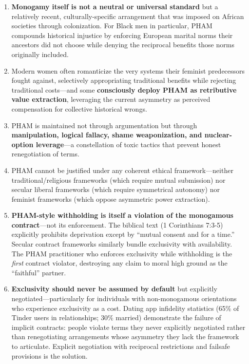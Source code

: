 \documentclass[12pt, letterpaper]{article}
\begin{document}
\begin{enumerate}
    \item \textbf{Monogamy itself is not a neutral or universal standard} but a relatively recent, culturally-specific arrangement that was imposed on African societies through colonization. For Black men in particular, PHAM compounds historical injustice by enforcing European marital norms their ancestors did not choose while denying the reciprocal benefits those norms originally included.
    
    \item Modern women often romanticize the very systems their feminist predecessors fought against, selectively appropriating traditional benefits while rejecting traditional costs---and some \textbf{consciously deploy PHAM as retributive value extraction}, leveraging the current asymmetry as perceived compensation for collective historical wrongs.
    
    \item PHAM is maintained not through argumentation but through \textbf{manipulation, logical fallacy, shame weaponization, and nuclear-option leverage}---a constellation of toxic tactics that prevent honest renegotiation of terms.
    
    \item PHAM cannot be justified under any coherent ethical framework---neither traditional/religious frameworks (which require mutual submission) nor secular liberal frameworks (which require symmetrical autonomy) nor feminist frameworks (which oppose asymmetric power extraction).
    
    \item \textbf{PHAM-style withholding is itself a violation of the monogamous contract}---not its enforcement. The biblical text (1 Corinthians 7:3-5) explicitly prohibits deprivation except by ``mutual consent and for a time.'' Secular contract frameworks similarly bundle exclusivity with availability. The PHAM practitioner who enforces exclusivity while withholding is the \textit{first} contract violator, destroying any claim to moral high ground as the ``faithful'' partner.
    
    \item \textbf{Exclusivity should never be assumed by default} but explicitly negotiated---particularly for individuals with non-monogamous orientations who experience exclusivity as a cost. Dating app infidelity statistics (65\% of Tinder users in relationships; 30\% married) demonstrate the failure of implicit contracts: people violate terms they never explicitly negotiated rather than renegotiating arrangements whose asymmetry they lack the framework to articulate. Explicit negotiation with reciprocal restrictions and failsafe provisions is the solution.
    

\end{enumerate}
\end{document}
